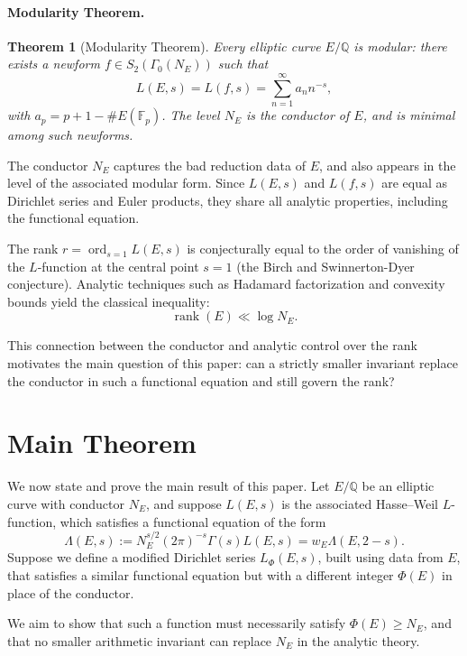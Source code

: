 \documentclass[a4paper,11pt]{article}
\theoremstyle{thmstyleone}%
\newtheorem{theorem}{Theorem}%
\theoremstyle{thmstyletwo}%
\theoremstyle{thmstylethree}%
\begin{document}
	\paragraph{Modularity Theorem.}
	\begin{theorem}[Modularity Theorem]
		Every elliptic curve \( E/\mathbb{Q} \) is modular: there exists a newform \( f \in S_2(\Gamma_0(N_E)) \) such that
		\[
		L(E, s) = L(f, s) = \sum_{n=1}^\infty a_n n^{-s},
		\]
		with \( a_p = p + 1 - \#E(\mathbb{F}_p) \). The level \( N_E \) is the conductor of \( E \), and is minimal among such newforms.
	\end{theorem}
	
	The conductor \( N_E \) captures the bad reduction data of \( E \), and also appears in the level of the associated modular form. Since \( L(E, s) \) and \( L(f, s) \) are equal as Dirichlet series and Euler products, they share all analytic properties, including the functional equation.
	
	The rank \( r = \operatorname{ord}_{s=1} L(E, s) \) is conjecturally equal to the order of vanishing of the \( L \)-function at the central point \( s = 1 \) (the Birch and Swinnerton-Dyer conjecture). Analytic techniques such as Hadamard factorization and convexity bounds yield the classical inequality:
	\[
	\operatorname{rank}(E) \ll \log N_E.
	\]
	
	This connection between the conductor and analytic control over the rank motivates the main question of this paper: can a strictly smaller invariant replace the conductor in such a functional equation and still govern the rank?
	
	\section{Main Theorem}
	
	We now state and prove the main result of this paper. Let \( E/\mathbb{Q} \) be an elliptic curve with conductor \( N_E \), and suppose \( L(E, s) \) is the associated Hasse–Weil \( L \)-function, which satisfies a functional equation of the form
	\[
	\Lambda(E, s) := N_E^{s/2} (2\pi)^{-s} \Gamma(s) L(E, s) = w_E \Lambda(E, 2 - s).
	\]
	Suppose we define a modified Dirichlet series \( L_{\Phi}(E, s) \), built using data from \( E \), that satisfies a similar functional equation but with a different integer \( \Phi(E) \) in place of the conductor.
	
	We aim to show that such a function must necessarily satisfy \( \Phi(E) \ge N_E \), and that no smaller arithmetic invariant can replace \( N_E \) in the analytic theory.
	
\end{document}
